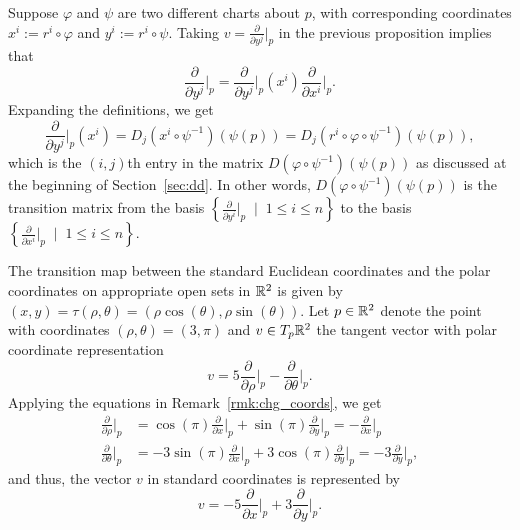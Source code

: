 \begin{remark}\label{rmk:chg_coords}
	Suppose $\varphi$ and $\psi$ are two different charts about $p$, with corresponding coordinates $x^i := r^i \circ \varphi$ and $y^i := r^i \circ \psi$.
	Taking $v = \frac{\partial}{\partial y^j}\Big|_p$ in the previous proposition implies that
	\begin{equation}\label{eq:vec:chg_coords}
		\frac{\partial}{\partial y^j}\Big|_p =
		\frac{\partial}{\partial y^j}\Big|_p (x^i) \frac{\partial}{\partial x^i}\Big|_p.
	\end{equation}
	Expanding the definitions, we get
	\begin{equation}
		\frac{\partial}{\partial y^j}\Big|_p (x^i) =
		D_j(x^i\circ\psi^{-1})(\psi(p)) =
		D_j(r^i \circ \varphi \circ \psi^{-1})(\psi(p)),
	\end{equation}
	which is the $(i,j)$th entry in the matrix $D(\varphi\circ\psi^{-1})(\psi(p))$ as discussed at the beginning of Section~\ref{sec:dd}.
	In other words, $D(\varphi\circ\psi^{-1})(\psi(p))$ is the transition matrix from the basis $\left\{\frac{\partial}{\partial y^i}\Big|_p\;\mid\; 1\leq i\leq n\right\}$ to the basis $\left\{\frac{\partial}{\partial x^i}\Big|_p\;\mid\; 1\leq i\leq n\right\}$.
\end{remark}

\begin{example}\label{ex:vec:chg_coords_polar}
	The transition map between the standard Euclidean coordinates and the polar coordinates on appropriate open sets in $\mathbb{R}^2$ is given by $(x,y) = \tau(\rho,\theta) = (\rho\cos(\theta), \rho\sin(\theta))$. Let $p\in\mathbb{R}^2$ denote the point with coordinates $(\rho, \theta) = (3, \pi)$ and $v\in T_p\mathbb{R}^2$ the tangent vector with polar coordinate representation
	\begin{equation}
		v = 5\frac{\partial}{\partial \rho}\Big|_p - \frac{\partial}{\partial \theta}\Big|_p.
	\end{equation}
	Applying the equations in Remark~\ref{rmk:chg_coords}, we get
	\begin{align}
		\frac{\partial}{\partial \rho}\Big|_p
		 & = \cos(\pi)\frac{\partial}{\partial x}\Big|_p + \sin(\pi)\frac{\partial}{\partial y}\Big|_p = - \frac{\partial}{\partial x}\Big|_p      \\
		\frac{\partial}{\partial \theta}\Big|_p
		 & = -3\sin(\pi)\frac{\partial}{\partial x}\Big|_p + 3\cos(\pi)\frac{\partial}{\partial y}\Big|_p = -3 \frac{\partial}{\partial y}\Big|_p,
	\end{align}
	and thus, the vector $v$ in standard coordinates is represented by
	\begin{equation}
		v = - 5 \frac{\partial}{\partial x}\Big|_p + 3 \frac{\partial}{\partial y}\Big|_p.
	\end{equation}
\end{example}

